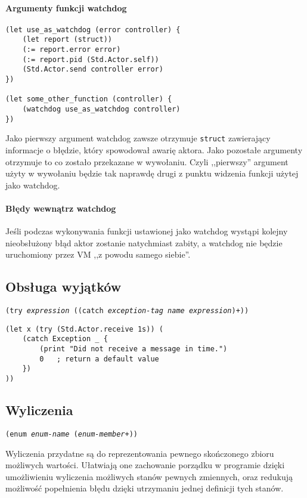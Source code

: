 \paragraph*{Argumenty funkcji watchdog}

\begin{lstlisting}
(let use_as_watchdog (error controller) {
    (let report (struct))
    (:= report.error error)
    (:= report.pid (Std.Actor.self))
    (Std.Actor.send controller error)
})

(let some_other_function (controller) {
    (watchdog use_as_watchdog controller)
})
\end{lstlisting}

Jako pierwszy argument watchdog zawsze otrzymuje \texttt{struct} zawierający informacje o błędzie, który
spowodował awarię aktora. Jako pozostałe argumenty otrzymuje to co zostało przekazane w wywołaniu.
Czyli ,,pierwszy'' argument użyty w wywołaniu będzie tak naprawdę drugi z punktu widzenia funkcji użytej jako
watchdog.

\paragraph*{Błędy wewnątrz watchdog}

Jeśli podczas wykonywania funkcji ustawionej jako watchdog wystąpi kolejny nieobsłużony błąd aktor zostanie
natychmiast zabity, a watchdog nie będzie uruchomiony przez VM ,,z powodu samego siebie''.

\subsection{Obsługa wyjątków}

\texttt{(try \emph{expression} ((catch \emph{exception-tag} \emph{name} \emph{expression})+))}

\begin{lstlisting}
(let x (try (Std.Actor.receive 1s)) (
    (catch Exception _ {
        (print "Did not receive a message in time.")
        0   ; return a default value
    })
))
\end{lstlisting}

\subsection{Wyliczenia}

\texttt{(enum \emph{enum-name} (\emph{enum-member}+))}
\newline

Wyliczenia przydatne są do reprezentowania pewnego skończonego zbioru możliwych wartości. Ułatwiają one
zachowanie porządku w programie dzięki umożliwieniu wyliczenia możliwych stanów pewnych zmiennych, oraz
redukują możliwość popełnienia błędu dzięki utrzymaniu jednej definicji tych stanów.

